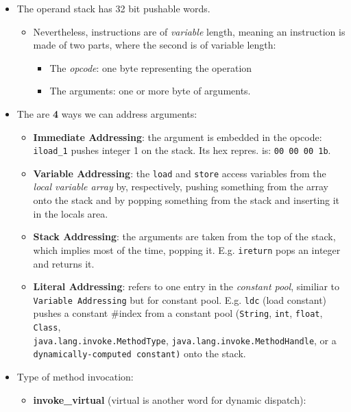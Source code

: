 \documentclass[a4paper,10pt]{article}
\begin{document}
\begin{itemize}
    \item The operand stack has 32 bit pushable words.
        \begin{itemize}
            \item Nevertheless, instructions are of \textit{variable} length, meaning an instruction is made of two parts, where the second is of variable length:
            \begin{itemize}
                \item The \textit{opcode}: one byte representing the operation
                \item The arguments: one or more byte of arguments.
            \end{itemize}
        \end{itemize}
     \item The are \textbf{4} ways we can address arguments:
     \begin{itemize}
         \item \textbf{Immediate Addressing}: the argument is embedded in the opcode: \verb|iload_1| pushes integer 1 on the stack. Its hex repres. is: \verb|00 00 00 1b|.
         \item \textbf{Variable Addressing}: the \verb|load| and \verb|store| access variables from the \textit{local variable array} by, respectively, pushing something from the array onto the stack and by popping something from the stack and inserting it in the locals area. 
        \item \textbf{Stack Addressing}: the arguments are taken from the top of the stack, which implies most of the time, popping it. E.g. \verb|ireturn| pops an integer and returns it.
        \item \textbf{Literal Addressing}: refers to one entry in the \textit{constant pool}, similiar to \verb|Variable Addressing| but for constant pool. E.g. \verb|ldc| (load constant) pushes a constant \#index from a constant pool (\verb|String|, \verb|int|, \verb|float|, \verb|Class|,\\ \verb|java.lang.invoke.MethodType|, \verb|java.lang.invoke.MethodHandle|, or a\\ \verb|dynamically-computed constant)| onto the stack. 
     \end{itemize}
     \item Type of method invocation:
     \begin{itemize}
         \item \textbf{invoke\_virtual} (virtual is another word for dynamic dispatch): 

\end{itemize}
\end{itemize}
\end{document}
